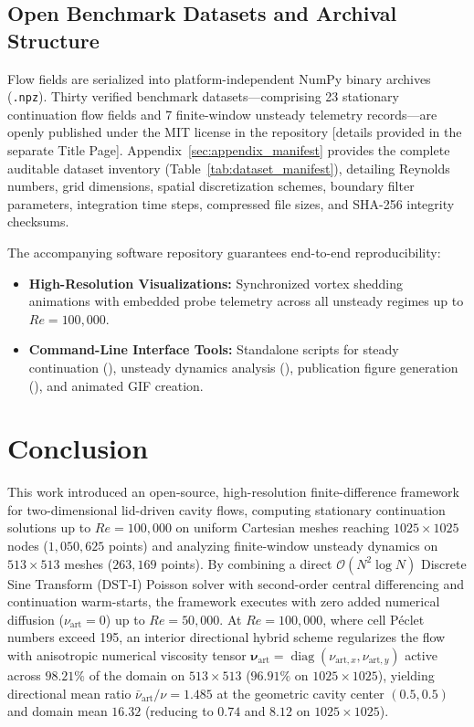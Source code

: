 \documentclass[11pt,a4paper]{article}
\begin{document}
\subsection{Open Benchmark Datasets and Archival Structure}
Flow fields are serialized into platform-independent NumPy binary archives (\texttt{.npz}). Thirty verified benchmark datasets—comprising 23 stationary continuation flow fields and 7 finite-window unsteady telemetry records—are openly published under the MIT license in the repository [details provided in the separate Title Page]. Appendix~\ref{sec:appendix_manifest} provides the complete auditable dataset inventory (Table~\ref{tab:dataset_manifest}), detailing Reynolds numbers, grid dimensions, spatial discretization schemes, boundary filter parameters, integration time steps, compressed file sizes, and SHA-256 integrity checksums.

The accompanying software repository guarantees end-to-end reproducibility:
\begin{itemize}
    \item \textbf{High-Resolution Visualizations:} Synchronized vortex shedding animations with embedded probe telemetry across all unsteady regimes up to $Re = 100{,}000$.
    \item \textbf{Command-Line Interface Tools:} Standalone scripts for steady continuation (), unsteady dynamics analysis (), publication figure generation (), and animated GIF creation.
\end{itemize}

\section{Conclusion}
This work introduced an open-source, high-resolution finite-difference framework for two-dimensional lid-driven cavity flows, computing stationary continuation solutions up to $Re = 100{,}000$ on uniform Cartesian meshes reaching $1025 \times 1025$ nodes ($1{,}050{,}625$ points) and analyzing finite-window unsteady dynamics on $513 \times 513$ meshes ($263{,}169$ points). By combining a direct $\mathcal{O}(N^2 \log N)$ Discrete Sine Transform (DST-I) Poisson solver with second-order central differencing and continuation warm-starts, the framework executes with zero added numerical diffusion ($\nu_{\text{art}} = 0$) up to $Re = 50{,}000$. At $Re = 100{,}000$, where cell P\'eclet numbers exceed 195, an interior directional hybrid scheme regularizes the flow with anisotropic numerical viscosity tensor $\boldsymbol{\nu}_{\mathrm{art}} = \operatorname{diag}(\nu_{\mathrm{art},x}, \nu_{\mathrm{art},y})$ active across $98.21\%$ of the domain on $513 \times 513$ ($96.91\%$ on $1025 \times 1025$), yielding directional mean ratio $\bar{\nu}_{\mathrm{art}}/\nu = 1.485$ at the geometric cavity center $(0.5, 0.5)$ and domain mean $16.32$ (reducing to $0.74$ and $8.12$ on $1025 \times 1025$).
\end{document}
